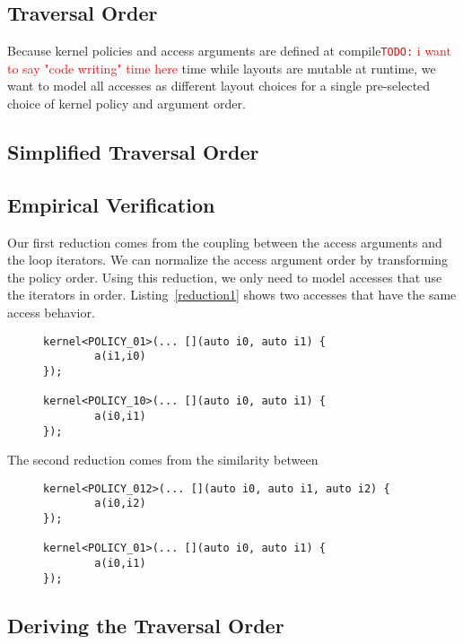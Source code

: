 \documentclass[sigconf, table]{acmart}
\newcommand{\todo}[1]{{\textcolor{red}{{\tt{TODO:}}\,\,#1 }}}
\begin{document}
\subsection{Traversal Order}

Because kernel policies and access arguments are defined at compile\todo{i want to say "code writing" time here} time while layouts are mutable at runtime, we want to model all accesses as different layout choices for a single pre-selected choice of kernel policy and argument order.



\subsection{Simplified Traversal Order}

\subsection{Empirical Verification}


Our first reduction comes from the coupling between the access arguments and the loop iterators. We can normalize the access argument order by transforming the policy order. Using this reduction, we only need to model accesses that use the iterators in order. Listing~\ref{reduction1} shows two accesses that have the same access behavior. 

\begin{figure}
	\begin{lstlisting}[caption={Equivalent loops for first reduction process.}, label={reduction1}]
kernel<POLICY_01>(... [](auto i0, auto i1) {
		a(i1,i0)
});

kernel<POLICY_10>(... [](auto i0, auto i1) {
		a(i0,i1)
});
	\end{lstlisting}
\end{figure}

The second reduction comes from the similarity between 
\begin{figure}
	\begin{lstlisting}[caption={Equivalent loops for second reduction process.}, label={reduction2}]
kernel<POLICY_012>(... [](auto i0, auto i1, auto i2) {
		a(i0,i2)
});

kernel<POLICY_01>(... [](auto i0, auto i1) {
		a(i0,i1)
});
	\end{lstlisting}
\end{figure}


\subsection{Deriving the Traversal Order}
\end{document}
